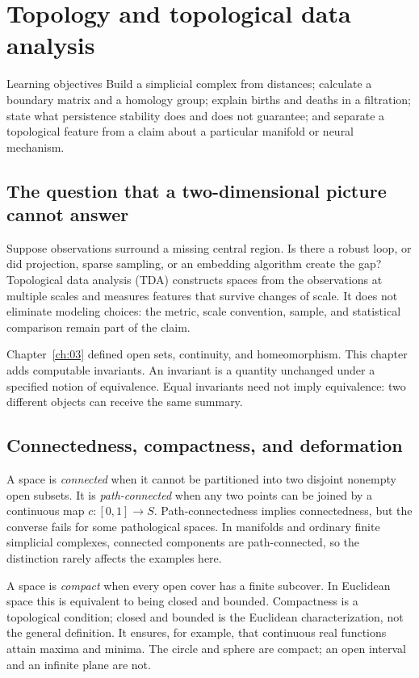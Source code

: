 \chapter{Topology and topological data analysis}\label{ch:04}
\begin{insight}{Learning objectives}
Build a simplicial complex from distances; calculate a boundary matrix and a homology group; explain births and deaths in a filtration; state what persistence stability does and does not guarantee; and separate a topological feature from a claim about a particular manifold or neural mechanism.
\end{insight}

\section{The question that a two-dimensional picture cannot answer}
Suppose observations surround a missing central region. Is there a robust loop, or did projection, sparse sampling, or an embedding algorithm create the gap? Topological data analysis (TDA) constructs spaces from the observations at multiple scales and measures features that survive changes of scale. It does not eliminate modeling choices: the metric, scale convention, sample, and statistical comparison remain part of the claim.

Chapter~\ref{ch:03} defined open sets, continuity, and homeomorphism. This chapter adds computable invariants. An invariant is a quantity unchanged under a specified notion of equivalence. Equal invariants need not imply equivalence: two different objects can receive the same summary.

\section{Connectedness, compactness, and deformation}
A space is \emph{connected} when it cannot be partitioned into two disjoint nonempty open subsets. It is \emph{path-connected} when any two points can be joined by a continuous map $c:[0,1]\to S$. Path-connectedness implies connectedness, but the converse fails for some pathological spaces. In manifolds and ordinary finite simplicial complexes, connected components are path-connected, so the distinction rarely affects the examples here.

A space is \emph{compact} when every open cover has a finite subcover. In Euclidean space this is equivalent to being closed and bounded. Compactness is a topological condition; closed and bounded is the Euclidean characterization, not the general definition. It ensures, for example, that continuous real functions attain maxima and minima. The circle and sphere are compact; an open interval and an infinite plane are not.

